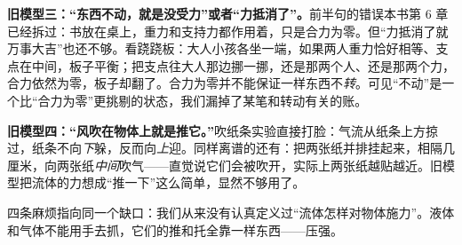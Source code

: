 \textbf{旧模型三：“东西不动，就是没受力”或者“力抵消了”。}前半句的错误本书第 6 章已经拆过：书放在桌上，重力和支持力都作用着，只是合力为零。但“力抵消了就万事大吉”也还不够。看跷跷板：大人小孩各坐一端，如果两人重力恰好相等、支点在中间，板子平衡；把支点往大人那边挪一挪，还是那两个人、还是那两个力，合力依然为零，板子却翻了。合力为零并不能保证一样东西不\emph{转}。可见“不动”是一个比“合力为零”更挑剔的状态，我们漏掉了某笔和转动有关的账。

\textbf{旧模型四：“风吹在物体上就是推它。”}吹纸条实验直接打脸：气流从纸条上方掠过，纸条不向\emph{下}躲，反而向\emph{上}迎。同样离谱的还有：把两张纸并排挂起来，相隔几厘米，向两张纸\emph{中间}吹气——直觉说它们会被吹开，实际上两张纸越贴越近。旧模型把流体的力想成“推一下”这么简单，显然不够用了。

四条麻烦指向同一个缺口：我们从来没有认真定义过“流体怎样对物体施力”。液体和气体不能用手去抓，它们的推和托全靠一样东西——压强。



